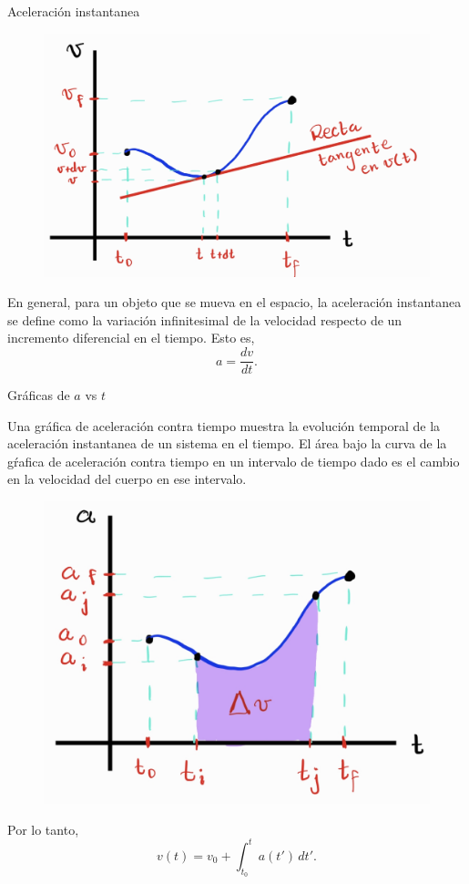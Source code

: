 \begin{frame}{Aceleración instantanea}


    \begin{figure}
        \centering
        \includegraphics[width=0.5\linewidth]{figures/VvsT3.jpg}
    \end{figure}
    
    En general, para un objeto que se mueva en el espacio, la aceleración instantanea se define como la variación infinitesimal de la velocidad respecto de un incremento diferencial en el tiempo. Esto es,
    \begin{equation}
        a=\frac{dv}{dt}.
    \end{equation}
\end{frame}

\begin{frame}{Gráficas de $a$ vs $t$}

Una gráfica de aceleración contra tiempo muestra la evolución temporal de la aceleración instantanea de un sistema en el tiempo. El área bajo la curva de la gŕafica de aceleración contra tiempo en un intervalo de tiempo dado es el cambio en la velocidad del cuerpo en ese intervalo.

\begin{figure}
    \centering
    \includegraphics[width=0.4\linewidth]{figures/AvsT1.jpg}
\end{figure}

Por lo tanto, \begin{equation}
    v(t) = v_0 + \int_{t_0}^ta(t')\,dt'.
\end{equation}

\end{frame}

